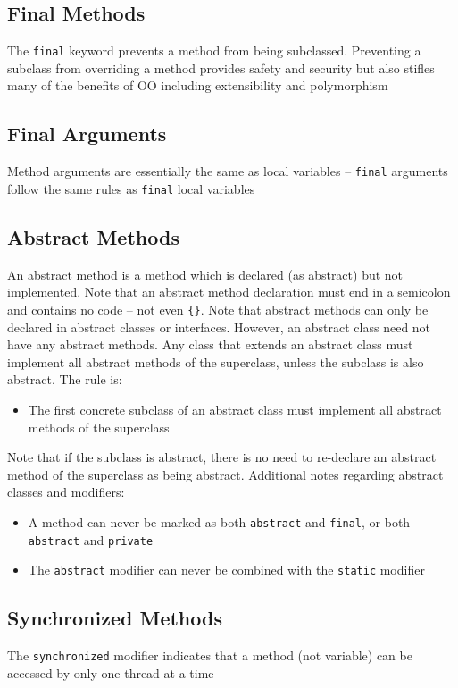 \subsection{Final Methods}
The \verb#final# keyword prevents a method from being subclassed. Preventing a 
subclass from overriding a method provides safety and security but also stifles 
many of the benefits of OO including extensibility and polymorphism

\subsection{Final Arguments}
Method arguments are essentially the same as local variables -- \verb#final# 
arguments follow the same rules as \verb#final# local variables

\subsection{Abstract Methods}
An abstract method is a method which is declared (as abstract) but not 
implemented. Note that an abstract method declaration must end in a semicolon 
and contains no code -- not even \verb#{}#. Note that abstract methods can only 
be declared in abstract classes or interfaces. However, an abstract class need 
not have any abstract methods. Any class that extends an abstract class must 
implement all abstract methods of the superclass, unless the subclass is also 
abstract. The rule is:
\begin{itemize}
    \item The first concrete subclass of an abstract class must implement all 
    abstract methods of the superclass
\end{itemize}
Note that if the subclass is abstract, there is no need to re-declare an 
abstract method of the superclass as being abstract. Additional notes regarding 
abstract classes and modifiers:
\begin{itemize}
    \item A method can never be marked as both \verb#abstract# and 
    \verb#final#, or both \verb#abstract# and \verb#private#
    \item The \verb#abstract# modifier can never be combined with the 
    \verb#static# modifier
\end{itemize}

\subsection{Synchronized Methods}
The \verb#synchronized# modifier indicates that a method (not variable) can be 
accessed by only one thread at a time

